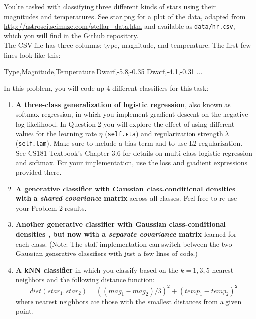 \documentclass[submit]{harvardml}
\begin{document}

\begin{problem}

You're tasked with classifying three different kinds of stars using their magnitudes and temperatures. See star.png for a plot of
the data, adapted from
\url{http://astrosci.scimuze.com/stellar_data.htm} and available as
\verb|data/hr.csv|, which you will find in the Github repository. \\

The CSV file has three columns: type, magnitude, and temperature. The
first few lines look like this:
\begin{csv}
Type,Magnitude,Temperature
Dwarf,-5.8,-0.35
Dwarf,-4.1,-0.31
...
\end{csv}

In this problem, you will code up 4 different classifiers for this task:
\begin{enumerate}[label=\alph*)]

\item \textbf{A three-class generalization of logistic regression},
  also known as softmax regression, in which you implement gradient
  descent on the negative log-likelihood. In Question 2 you will
  explore the effect of using different values for the learning rate
  $\eta$ (\texttt{self.eta}) and regularization strength $\lambda$
  (\texttt{self.lam}).  Make sure to include a bias term and to use L2
  regularization. See CS181 Textbook's Chapter 3.6 for details on  multi-class logistic regression and softmax. For your implementation, use the loss and gradient expressions provided there.

\item \textbf{A generative classifier with Gaussian class-conditional
  densities with a \textit{shared covariance} matrix} across all classes. 
  Feel free to re-use your Problem 2 results.
\item \textbf{Another generative classifier with Gaussian class-conditional densities , but now 
with a \textit{separate covariance} matrix} learned for each class. (Note: 
The staff implementation can switch between the two Gaussian generative classifiers with just a
few lines of code.)

\item \textbf{A kNN classifier} in which you classify based on the $k=1,3,5$ nearest neighbors and the following distance function: $$dist(star_1, star_2) = ((mag_1 - mag_2)/3)^2 + (temp_1 - temp_2)^2$$
where nearest neighbors are those with the smallest distances from a given point.


\end{enumerate}
\end{problem}
\end{document}
